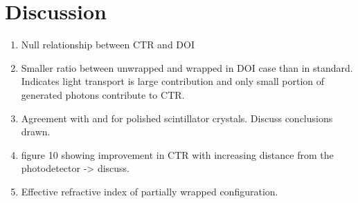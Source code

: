 \section{Discussion}

\begin{enumerate}
\item Null relationship between CTR and DOI
\item Smaller ratio between unwrapped and wrapped in DOI case than in standard. Indicates light transport is large contribution and only small portion of generated photons contribute to CTR.
\item Agreement with \cite{Bircher_Shao_2012} and \cite{Moses_2001} for polished scintillator crystals. Discuss conclusions drawn.
\item \cite{Yeom_Vinke_Levin_2013} figure 10 showing improvement in CTR with increasing distance from the photodetector -> discuss.
\item Effective refractive index of partially wrapped configuration.
\end{enumerate}
